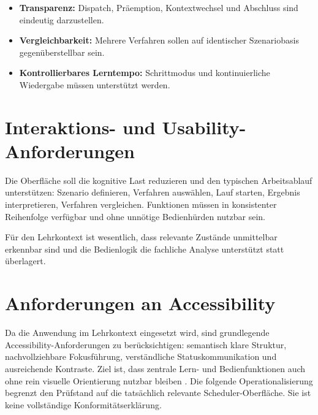 \begin{itemize}
    \item \textbf{Transparenz:} Dispatch, Präemption, Kontextwechsel und Abschluss sind eindeutig darzustellen.
    \item \textbf{Vergleichbarkeit:} Mehrere Verfahren sollen auf identischer Szenariobasis gegenüberstellbar sein.
    \item \textbf{Kontrollierbares Lerntempo:} Schrittmodus und kontinuierliche Wiedergabe müssen unterstützt werden.
\end{itemize}

\section{Interaktions- und Usability-Anforderungen}

Die Oberfläche soll die kognitive Last reduzieren und den typischen Arbeitsablauf unterstützen: Szenario definieren, Verfahren auswählen, Lauf starten, Ergebnis interpretieren, Verfahren vergleichen. Funktionen müssen in konsistenter Reihenfolge verfügbar und ohne unnötige Bedienhürden nutzbar sein.

Für den Lehrkontext ist wesentlich, dass relevante Zustände unmittelbar erkennbar sind und die Bedienlogik die fachliche Analyse unterstützt statt überlagert.

\section{Anforderungen an Accessibility}

Da die Anwendung im Lehrkontext eingesetzt wird, sind grundlegende Accessibility-Anforderungen zu berücksichtigen: semantisch klare Struktur, nachvollziehbare Fokusführung, verständliche Statuskommunikation und ausreichende Kontraste. Ziel ist, dass zentrale Lern- und Bedienfunktionen auch ohne rein visuelle Orientierung nutzbar bleiben \cite{wcag2018}. Die folgende Operationalisierung begrenzt den Prüfstand auf die tatsächlich relevante Scheduler-Oberfläche. Sie ist keine vollständige Konformitätserklärung.

